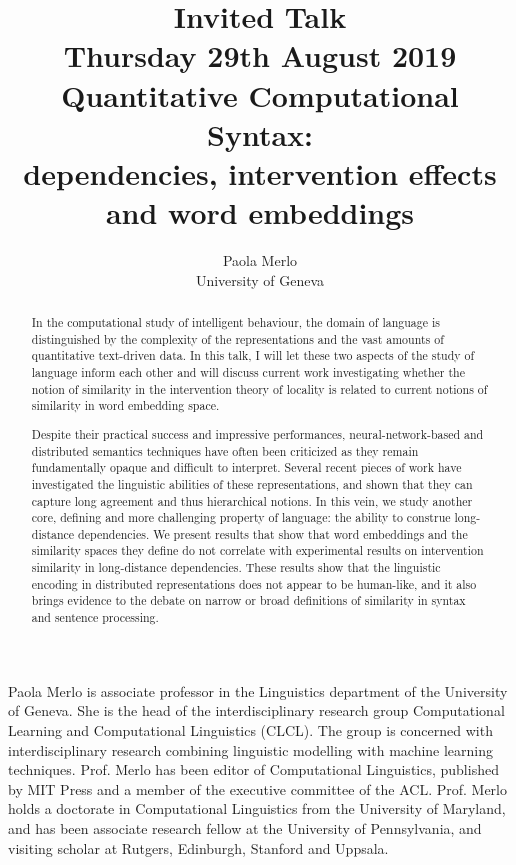 \documentclass[11pt]{article}
\title{Invited Talk\\
  {\small Thursday 29th August 2019}\\
  Quantitative Computational Syntax:\\ dependencies, intervention effects and word embeddings}
\author{Paola Merlo\\
  University of Geneva}
\begin{document}
\maketitle
\begin{abstract}
In the  computational study  of intelligent  behaviour, the  domain of
language is distinguished by the complexity of the representations and
the vast amounts  of quantitative text-driven  data. In this talk,  I will
let these two  aspects of the study of language  inform each other and
will  discuss  current  work   investigating  whether  the  notion  of
similarity  in  the intervention  theory  of  locality is  related  to
current notions of similarity in word embedding space.

Despite   their  practical   success   and  impressive   performances,
neural-network-based and  distributed semantics techniques  have often
been criticized as  they remain fundamentally opaque  and difficult to
interpret.   Several  recent  pieces  of work  have  investigated  the
linguistic abilities of these representations, and shown that they can
capture long agreement  and thus hierarchical notions.   In this vein,
we  study another  core,  defining and  more  challenging property  of
language:  the ability  to  construe  long-distance dependencies.   We
present  results that  show that  word embeddings  and the  similarity
spaces  they define  do  not correlate  with  experimental results  on
intervention similarity  in long-distance dependencies.  These results
show that the linguistic  encoding in distributed representations does
not appear to be human-like, and it also brings evidence to the debate
on narrow  or broad definitions  of similarity in syntax  and sentence
      processing.
\end{abstract}

\vspace{4mm}
\begin{shortbio}
  Paola Merlo  is associate professor  in the Linguistics  department of
the University  of Geneva.  She  is the head of  the interdisciplinary
research  group Computational  Learning and  Computational Linguistics
(CLCL).   The  group  is  concerned  with  interdisciplinary  research
combining  linguistic  modelling  with  machine  learning  techniques.
Prof.  Merlo  has been editor of  Computational Linguistics, published
by  MIT  Press  and  a  member  of  the  executive  committee  of  the
ACL. Prof. Merlo holds a  doctorate in  Computational Linguistics  from the
University of Maryland,  and  has been  associate research fellow
at the  University of Pennsylvania,  and visiting scholar  at Rutgers,
Edinburgh, Stanford and Uppsala.
\end{shortbio}
\end{document}
